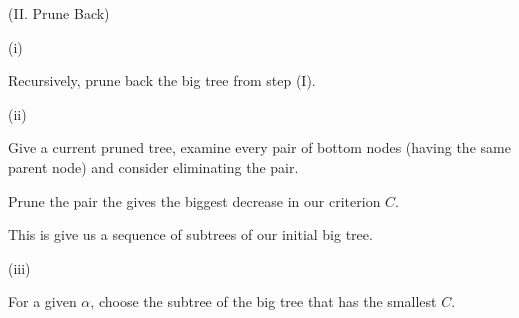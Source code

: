 \documentclass{beamer}
\newcommand{\bl}{\color{lightblue}}
\newcommand{\rd}{\color{burntorange}}
\newcommand{\sko}{\vspace{.1in}}
\newcommand{\skoo}{\vspace{.2in}}
\begin{document}
\begin{frame}

{\bl (II. Prune Back)}\sko


{\rd (i)}\sko

Recursively, prune back the big tree from step (I).\skoo

{\rd (ii)}\sko

Give a current pruned tree, examine every pair of bottom nodes (having the same parent node)
and consider eliminating the pair.\sko 

Prune the pair the gives the biggest decrease in our criterion $C$.\sko

This is give us a sequence of subtrees of our initial big tree.\skoo

{\rd (iii)}\sko

For a given $\alpha$, choose the subtree of the big tree that has the smallest $C$.
\end{frame}
\end{document}
